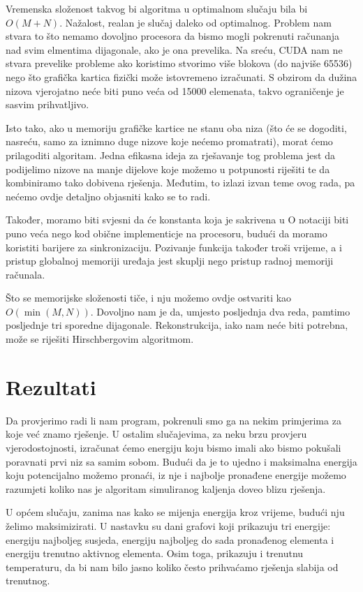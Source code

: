 \documentclass[times, utf8, zavrsni]{fer}
\begin{document}
Vremenska složenost takvog bi algoritma u optimalnom slučaju bila
bi $O(M+N)$. Nažalost, realan je slučaj daleko od optimalnog. 
Problem nam stvara to što nemamo dovoljno procesora da bismo
mogli pokrenuti računanja nad svim elmentima dijagonale, ako je
ona prevelika. Na sreću, CUDA nam ne stvara prevelike probleme
ako koristimo stvorimo više blokova (do najviše 65536) nego što
grafička kartica fizički može istovremeno izračunati. S obzirom
da dužina nizova vjerojatno neće biti puno veća od 15000 elemenata, 
takvo ograničenje je sasvim prihvatljivo.

Isto tako, ako u memoriju grafičke kartice ne stanu
oba niza (što će se dogoditi, nasreću, samo za iznimno
duge nizove koje nećemo promatrati), morat ćemo prilagoditi
algoritam. Jedna efikasna ideja
za rješavanje tog problema jest da podijelimo nizove na manje
dijelove koje možemo u potpunosti riješiti te da kombiniramo
tako dobivena rješenja. 
Međutim, to izlazi izvan teme ovog rada, pa nećemo
ovdje detaljno objasniti kako se to radi.

Također, moramo biti svjesni da će konstanta koja je sakrivena u O
notaciji biti puno veća nego kod obične implementicje na procesoru,
budući da moramo koristiti barijere za sinkronizaciju. Pozivanje
funkcija također troši vrijeme, a i pristup globalnoj memoriji
uređaja jest skuplji nego pristup radnoj memoriji računala. 

Što se memorijske složenosti tiče, i nju možemo ovdje ostvariti
kao $O(\min(M,N))$. Dovoljno nam je da, umjesto posljednja dva reda,
pamtimo posljednje tri sporedne dijagonale. Rekonstrukcija, iako
nam neće biti potrebna, može se riješiti Hirschbergovim algoritmom. 


\chapter{Rezultati}

Da provjerimo radi li nam program, pokrenuli smo ga
na nekim primjerima za koje već znamo rješenje. 
U ostalim slučajevima, za neku brzu provjeru vjerodostojnosti,
izračunat ćemo energiju koju bismo imali ako bismo pokušali
poravnati prvi niz sa samim
sobom. Budući da je to ujedno i maksimalna energija koju potencijalno
možemo pronaći, iz nje i najbolje pronađene energije možemo
razumjeti koliko nas je algoritam simuliranog kaljenja doveo
blizu rješenja. 

U općem slučaju, zanima nas kako se mijenja energija kroz vrijeme,
budući nju želimo maksimizirati. U nastavku
su dani grafovi koji prikazuju tri energije: energiju najboljeg
susjeda, energiju najboljeg do sada pronađenog elementa i
energiju trenutno aktivnog elementa. Osim toga, prikazuju i
trenutnu temperaturu, da bi nam bilo jasno koliko često
prihvaćamo rješenja slabija od trenutnog. 
\end{document}
